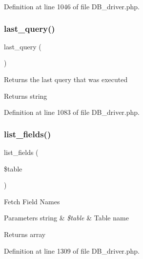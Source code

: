 Definition at line 1046 of file D\+B\+\_\+driver.\+php.

\mbox{\label{class_c_i___d_b__driver_a8117354f1fa0b2873f0ad2792dc21389}} 
\subsubsection{\texorpdfstring{last\_query()}{last\_query()}}
{\footnotesize\ttfamily last\+\_\+query (\begin{DoxyParamCaption}{ }\end{DoxyParamCaption})}

Returns the last query that was executed

\begin{DoxyReturn}{Returns}
string 
\end{DoxyReturn}


Definition at line 1083 of file D\+B\+\_\+driver.\+php.

\mbox{\label{class_c_i___d_b__driver_aef08cd376b16b24608100ca0e3f2f85b}} 
\subsubsection{\texorpdfstring{list\_fields()}{list\_fields()}}
{\footnotesize\ttfamily list\+\_\+fields (\begin{DoxyParamCaption}\item[{}]{\$table }\end{DoxyParamCaption})}

Fetch Field Names


\begin{DoxyParams}[1]{Parameters}
string & {\em \$table} & Table name \\
\hline
\end{DoxyParams}
\begin{DoxyReturn}{Returns}
array 
\end{DoxyReturn}


Definition at line 1309 of file D\+B\+\_\+driver.\+php.

\mbox{\label{class_c_i___d_b__driver_accef90659bed312aba1c3df80620b402}} 

